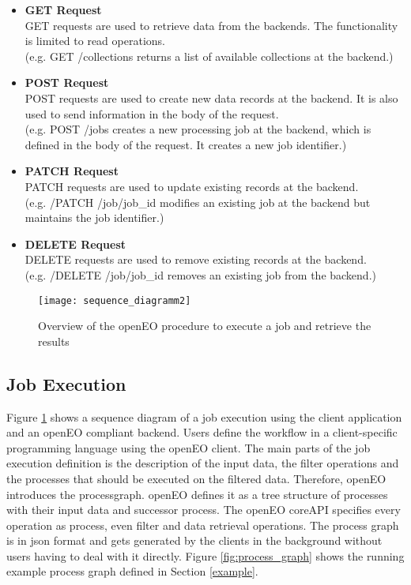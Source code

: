\documentclass[draft,final]{vutinfth} %
\begin{document}
\begin{itemize}
	\item \textbf{GET Request} \\
	GET requests are used to retrieve data from the backends. The functionality is limited to read operations. \\(e.g. GET /collections returns a list of available collections at the backend.)
	\item \textbf{POST Request} \\ 
	POST requests are used to create new data records at the backend. It is also used to send information in the body of the request. \\(e.g. POST /jobs creates a new processing job at the backend, which is defined in the body of the request. It creates a new job identifier.)  
	\item \textbf{PATCH Request} \\
	PATCH requests are used to update existing records at the backend. \\(e.g. /PATCH /job/{job\_id} modifies an existing job at the backend but maintains the job identifier.)
	\item \textbf{DELETE Request} \\ 
	DELETE requests are used to remove existing records at the backend. \\(e.g. /DELETE /job/{job\_id} removes an existing job from the backend.)
\end{itemize}

\begin{figure}[h]
	\centering
	\texttt{[image: sequence\_diagramm2]}
	\caption{Overview of the openEO procedure to execute a job and retrieve the results}
	\label{fig:api2} %
\end{figure}


\subsection{Job Execution}\label{Job Execution}
Figure \ref{fig:api2} shows a sequence diagram of a job execution using the client application and an openEO compliant backend. Users define the workflow in a client-specific programming language using the openEO client. The main parts of the job execution definition is the description of the input data, the filter operations and the processes that should be executed on the filtered data. Therefore, openEO introduces the \gls{processgraph}. openEO defines it as a tree structure of processes with their input data and successor process. The openEO coreAPI specifies every operation as process, even filter and data retrieval operations. The process graph is in \gls{json} format and gets generated by the clients in the background without users having to deal with it directly. Figure \ref{fig:process_graph} shows the running example process graph defined in Section \ref{example}.  
\end{document}
